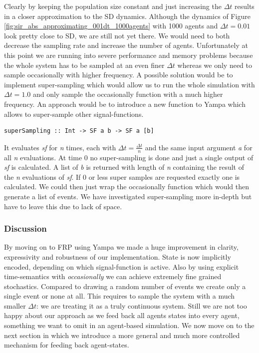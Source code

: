 Clearly by keeping the population size constant and just increasing the $\Delta t$ results in a closer approximation to the SD dynamics. Although the dynamics of Figure \ref{fig:sir_abs_approximating_001dt_1000agents} with 1000 agents and $\Delta t = 0.01$ look pretty close to SD, we are still not yet there. We would need to both decrease the sampling rate and increase the number of agents. Unfortunately at this point we are running into severe performance and memory problems because the whole system has to be sampled at an even finer $\Delta t$ whereas we only need to sample occasionally with higher frequency. A possible solution would be to implement super-sampling which would allow us to run the whole simulation with $\Delta t = 1.0$ and only sample the occasionally function with a much higher frequency. An approach would be to introduce a new function to Yampa which allows to super-sample other signal-functions. 

\begin{verbatim}
superSampling :: Int -> SF a b -> SF a [b]
\end{verbatim}

It evaluates \textit{sf} for \textit{n} times, each with $\Delta t = \frac{\Delta t}{n}$ and the same input argument \textit{a} for all \textit{n} evaluations. At time 0 no super-sampling is done and just a single output of \textit{sf} is calculated. A list of \textit{b} is returned with length of \textit{n} containing the result of the \textit{n} evaluations of \textit{sf}. If 0 or less super samples are requested exactly one is calculated. We could then just wrap the occasionally function which would then generate a list of events. We have investigated super-sampling more in-depth but have to leave this due to lack of space.

\subsubsection{Discussion}
By moving on to FRP using Yampa we made a huge improvement in clarity, expressivity and robustness of our implementation. State is now implicitly encoded, depending on which signal-function is active. Also by using explicit time-semantics with \textit{occasionally} we can achieve extremely fine grained stochastics. Compared to drawing a random number of events we create only a single event or none at all. This requires to sample the system with a much smaller $\Delta t$: we are treating it as a truly continuous system.
Still we are not too happy about our approach as we feed back all agents states into every agent, something we want to omit in an agent-based simulation. We now move on to the next section in which we introduce a more general and much more controlled mechanism for feeding back agent-states. 